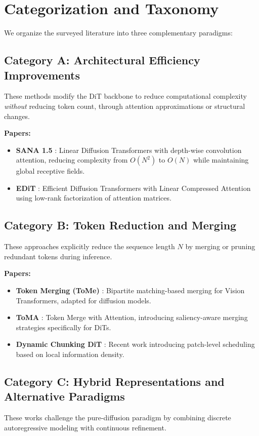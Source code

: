 \documentclass{article}
\begin{document}
\section{Categorization and Taxonomy}

We organize the surveyed literature into three complementary paradigms:

\subsection{Category A: Architectural Efficiency Improvements}
These methods modify the DiT backbone to reduce computational complexity
\textit{without} reducing token count, through attention approximations or
structural changes.

\textbf{Papers:}
\begin{itemize}
    \item \textbf{SANA 1.5} \cite{xie2025sana}: Linear Diffusion Transformers
          with depth-wise convolution attention, reducing complexity from $O(N^2)$ to
          $O(N)$ while maintaining global receptive fields.
    \item \textbf{EDiT} \cite{becker2025edit}: Efficient Diffusion Transformers
          with Linear Compressed Attention using low-rank factorization of attention
          matrices.
\end{itemize}

\subsection{Category B: Token Reduction and Merging}
These approaches explicitly reduce the sequence length $N$ by merging or
pruning redundant tokens during inference.

\textbf{Papers:}
\begin{itemize}
    \item \textbf{Token Merging (ToMe)} \cite{bolya2023token}: Bipartite
          matching-based merging for Vision Transformers, adapted for diffusion models.
    \item \textbf{ToMA} \cite{lu2025toma}: Token Merge with Attention,
          introducing saliency-aware merging strategies specifically for DiTs.
    \item \textbf{Dynamic Chunking DiT} \cite{haridas2026dynamic}: Recent work
          introducing patch-level scheduling based on local information density.
\end{itemize}

\subsection{Category C: Hybrid Representations and Alternative Paradigms}
These works challenge the pure-diffusion paradigm by combining discrete
autoregressive modeling with continuous refinement.
\end{document}
